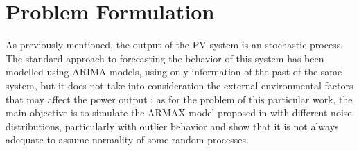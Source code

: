 \section{Problem Formulation}\label{sec:probForm}
As previously mentioned, the output of the PV system is an stochastic process. The standard approach to forecasting the behavior of this system has been modelled using ARIMA models, using only information of the past of the same system, but it does not take into consideration the external environmental factors that may affect the power output \cite{li2014armax}; as for the problem of this particular work, the main objective is to simulate the ARMAX model proposed in \cite{li2014armax} with different noise distributions, particularly with outlier behavior and show that it is not always adequate to assume normality of some random processes.
